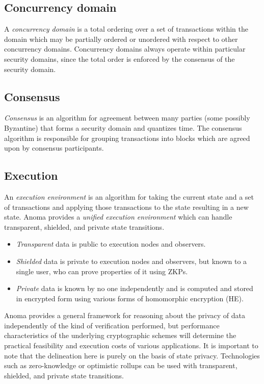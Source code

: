 \subsection{Concurrency domain}\label{concurrency-domain}

A \emph{concurrency domain} is a total ordering over a set of
transactions within the domain which may be partially ordered or
unordered with respect to other concurrency domains. Concurrency domains
always operate within particular security domains, since the total order
is enforced by the consensus of the security domain.

\subsection{Consensus}\label{consensus}

\emph{Consensus} is an algorithm for agreement between many parties
(some possibly Byzantine) that forms a security domain and quantizes
time. The consensus algorithm is responsible for grouping transactions
into blocks which are agreed upon by consensus participants.

\subsection{Execution}\label{execution}

An \emph{execution environment} is an algorithm for taking the current
state and a set of transactions and applying those transactions to the
state resulting in a new state. Anoma provides a \emph{unified execution
environment} which can handle transparent, shielded, and private state
transitions.

\begin{itemize}
\tightlist
\item
  \emph{Transparent} data is public to execution nodes and observers.
\item
  \emph{Shielded} data is private to execution nodes and observers, but
  known to a single user, who can prove properties of it using ZKPs.
\item
  \emph{Private} data is known by no one independently and is computed
  and stored in encrypted form using various forms of homomorphic
  encryption (HE).
\end{itemize}

Anoma provides a general framework for reasoning about the privacy of
data independently of the kind of verification performed, but
performance characteristics of the underlying cryptographic schemes will
determine the practical feasibility and execution costs of various
applications. It is important to note that the delineation here is
purely on the basis of state privacy. Technologies such as
zero-knowledge or optimistic rollups can be used with transparent,
shielded, and private state transitions.

